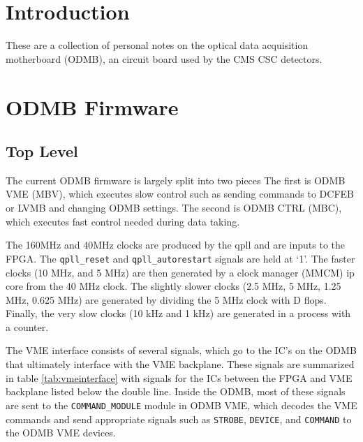 \documentclass[10pt,a4paper]{article}
\begin{document}

\section{Introduction}

These are a collection of personal notes on the optical data acquisition motherboard (ODMB), an circuit board used by the CMS CSC detectors.

\section{ODMB Firmware}

\subsection{Top Level}

The current ODMB firmware is largely split into two pieces The first is ODMB VME (MBV), which executes slow control such as sending commands to DCFEB or LVMB and changing ODMB settings. The second is ODMB CTRL (MBC), which executes fast control needed during data taking.

The 160MHz and 40MHz clocks are produced by the qpll and are inputs to the FPGA. The \texttt{qpll\_reset} and \texttt{qpll\_autorestart} signals are held at `1'. The faster clocks (10 MHz, and 5 MHz) are then generated by a clock manager (MMCM) ip core from the 40 MHz clock. The slightly slower clocks (2.5 MHz, 5 MHz, 1.25 MHz, 0.625 MHz) are generated by dividing the 5 MHz clock with D flops. Finally, the very slow clocks (10 kHz and 1 kHz) are generated in a process with a counter.

The VME interface consists of several signals, which go to the IC's on the ODMB that ultimately interface with the VME backplane. These signals are summarized in table \ref{tab:vmeinterface} with signals for the ICs between the FPGA and VME backplane listed below the double line. Inside the ODMB, most of these signals are sent to the \texttt{COMMAND\_MODULE} module in ODMB VME, which decodes the VME commands and send appropriate signals such as \texttt{STROBE}, \texttt{DEVICE}, and \texttt{COMMAND} to the ODMB VME devices. 
\end{document}
